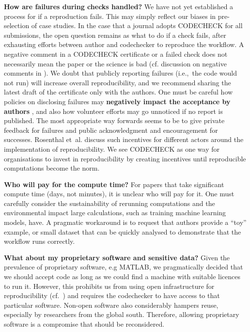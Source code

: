 \documentclass[12pt]{article}
\begin{document}
\textbf{How are failures during checks handled?}
We have not yet established a process for if a reproduction fails.  This
may simply reflect our biases in pre-selection of case studies.  In
the case that a journal adopts CODECHECK for all submissions, the open
question remains as what to do if a check fails, after exhausting
efforts between author and codechecker to reproduce the workflow.  A
negative comment in a CODECHECK certificate or a failed check does not
necessarily mean the paper or the science is bad (cf. discussion on
negative comments in \cite{everythinghertz123}).  We doubt that
publicly reporting failures (i.e.,~the code would not run) will
increase overall reproducibility, and we recommend sharing the latest
draft of the certificate only with the authors.  One must be careful
how policies on disclosing failures may \textbf{negatively impact the
  acceptance by authors}
, and also how volunteer efforts may go unnoticed if no report is
published.  The most appropriate way forwards seems to be to give
private feedback for failures and public acknowledgment and
encouragement for successes.
Rosenthal et~al. \cite{Rosenthal2016b} discuss such incentives for different actors around the
implementation of reproducibility. We see CODECHECK as one way for
organisations to invest in reproducibility by creating incentives
until reproducible computations become the norm.

\textbf{Who will pay for the compute time?}  For papers that take
significant compute time (days, not minutes), it is unclear who will
pay for it. One must carefully consider the sustainability of
rerunning computations and the environmental impact large
calculations, such as training machine learning models, have.  A
pragmatic workaround is to request that authors provide a ``toy''
example, or small dataset that can be quickly analysed to demonstrate
that the workflow runs correctly.

\textbf{What about my proprietary software and sensitive data?}  Given
the prevalence of proprietary software, e.g MATLAB, we pragmatically
decided that we should accept code as long as we could find a machine
with suitable licences to run it.  However, this prohibits us from
using open infrastructure for reproducibility
(cf.~\cite{konkol_publishing_2020,perkel_make_2019}) and requires the
codechecker to have access to that particular software.  Non-open
software also considerably hampers reuse, especially by researchers
from the global south. Therefore, allowing proprietary software is a
compromise that should be reconsidered.
\end{document}
